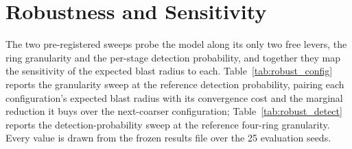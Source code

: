 \documentclass[journal]{IEEEtran}
\begin{document}
\section{Robustness and Sensitivity}
The two pre-registered sweeps probe the model along its only two free levers, the ring granularity
and the per-stage detection probability, and together they map the sensitivity of the expected blast
radius to each. Table~\ref{tab:robust_config} reports the granularity sweep at the reference detection
probability, pairing each configuration's expected blast radius with its convergence cost and the
marginal reduction it buys over the next-coarser configuration; Table~\ref{tab:robust_detect} reports
the detection-probability sweep at the reference four-ring granularity. Every value is drawn from the
frozen results file over the 25 evaluation seeds.

\begin{table}[t]
\centering
\caption{Granularity sweep: expected blast radius, convergence cost, and marginal reduction by ring
count at the reference detection probability $p = 0.80$ (mean over 25 seeds).}
\label{tab:robust_config}
\footnotesize
\setlength{\tabcolsep}{5pt}
\end{table}

\begin{table}[t]
\centering
\caption{Detection-probability sweep: expected blast radius of the reference four-ring rollout as the
per-stage detection probability varies (mean over 25 seeds), with the implied reduction relative to
the big-bang value of $1.0$.}
\label{tab:robust_detect}
\footnotesize
\setlength{\tabcolsep}{6pt}
\end{table}
\end{document}
